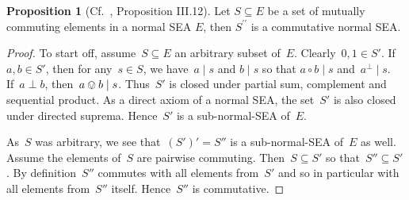 \documentclass[a4paper, onecolumn, accepted=2020-12-22]{quantumarticle}
\newcommand{\mult}{\mathop{\circ}}
\newcommand{\commu}{\mathrel{\lvert}}
\newcommand{\TODO}[1]{\textcolor{blue}{\emph{[ #1 ]}}}
\newcounter{counter}
\theoremstyle{definition}
\newtheorem{proposition}[counter]{Proposition}
\begin{document}
\begin{proposition}[Cf.~\cite{wetering2018characterisation}, Proposition III.12]\label{prop:doublecommutant}
Let $S\subseteq E$ be a set of mutually commuting elements in
    a normal SEA $E$, then $S^{\prime\prime}$ is a commutative normal SEA.
\end{proposition}
\begin{proof}
    To start off, assume~$S \subseteq E$ an arbitrary subset of~$E$.
    Clearly~$0,1 \in S'$.
    If~$a,b\in S'$, then for any~$s \in S$,
        we have~$a\commu s$ and $b\commu s$ so that $a\mult b \commu s$
            and~$a^\perp \commu s$.
    If~$a \perp b$, then~$a \ovee b \commu s$.
    Thus~$S'$ is closed under partial sum, complement and sequential product.
    As a direct axiom of a normal SEA,
        the set~$S'$ is also closed under directed suprema.
    Hence~$S'$ is a sub-normal-SEA of~$E$.

    As~$S$ was arbitrary, we see that~$(S')' =  S''$ is a sub-normal-SEA of~$E$ as well.
    Assume the elements of~$S$ are pairwise commuting.
    Then~$S \subseteq S'$ so that~$S'' \subseteq S'$.
    By definition~$S''$ commutes with all elements from~$S'$
        and so in particular with all elements from~$S''$ itself.
        Hence~$S''$ is commutative.
\end{proof}

\end{document}
